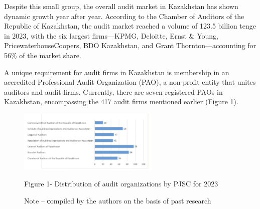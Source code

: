 \begin{multicols}{2}
Despite this small group, the overall audit market in Kazakhstan has
shown dynamic growth year after year. According to the Chamber of
Auditors of the Republic of Kazakhstan, the audit market reached a
volume of 123.5 billion tenge in 2023, with the six largest
firms---KPMG, Deloitte, Ernst \& Young, PricewaterhouseCoopers, BDO
Kazakhstan, and Grant Thornton---accounting for 56\% of the market
share.

A unique requirement for audit firms in Kazakhstan is membership in an
accredited Professional Audit Organization (PAO), a non-profit entity
that unites auditors and audit firms. Currently, there are seven
registered PAOs in Kazakhstan, encompassing the 417 audit firms
mentioned earlier (Figure 1).
\end{multicols}

\begin{figure}[H]
	\centering
	\includegraphics[width=0.6\textwidth]{media/ekon/image7.2}
	\caption*{Figure 1- Distribution of audit organizations by PJSC for 2023}
	\caption*{Note -- сompiled by the authors on the basis of past research}

\end{figure}

